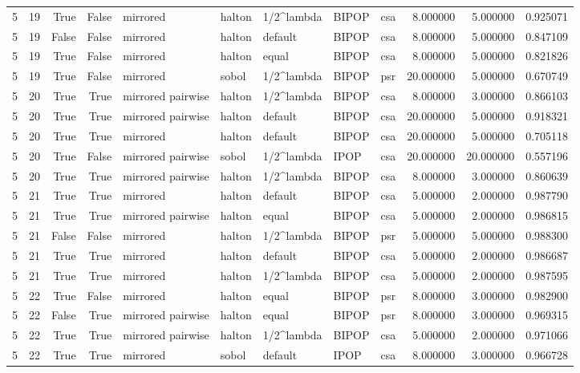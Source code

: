 \begin{tabular}{rrrrlllllrrr}
5 & 19 & True & False & mirrored & halton & 1/2^lambda & BIPOP & csa & 8.000000 & 5.000000 & 0.925071 \\
5 & 19 & False & False & mirrored & halton & default & BIPOP & csa & 8.000000 & 5.000000 & 0.847109 \\
5 & 19 & True & False & mirrored & halton & equal & BIPOP & csa & 8.000000 & 5.000000 & 0.821826 \\
5 & 19 & True & False & mirrored & sobol & 1/2^lambda & BIPOP & psr & 20.000000 & 5.000000 & 0.670749 \\
5 & 20 & True & True & mirrored pairwise & halton & 1/2^lambda & BIPOP & csa & 8.000000 & 3.000000 & 0.866103 \\
5 & 20 & True & True & mirrored pairwise & halton & default & BIPOP & csa & 20.000000 & 5.000000 & 0.918321 \\
5 & 20 & True & True & mirrored & halton & default & BIPOP & csa & 20.000000 & 5.000000 & 0.705118 \\
5 & 20 & True & False & mirrored pairwise & sobol & 1/2^lambda & IPOP & csa & 20.000000 & 20.000000 & 0.557196 \\
5 & 20 & True & True & mirrored pairwise & halton & 1/2^lambda & BIPOP & csa & 8.000000 & 3.000000 & 0.860639 \\
5 & 21 & True & True & mirrored & halton & default & BIPOP & csa & 5.000000 & 2.000000 & 0.987790 \\
5 & 21 & True & True & mirrored pairwise & halton & equal & BIPOP & csa & 5.000000 & 2.000000 & 0.986815 \\
5 & 21 & False & False & mirrored & halton & 1/2^lambda & BIPOP & psr & 5.000000 & 5.000000 & 0.988300 \\
5 & 21 & True & True & mirrored & halton & default & BIPOP & csa & 5.000000 & 2.000000 & 0.986687 \\
5 & 21 & True & True & mirrored & halton & 1/2^lambda & BIPOP & csa & 5.000000 & 2.000000 & 0.987595 \\
5 & 22 & True & False & mirrored & halton & equal & BIPOP & psr & 8.000000 & 3.000000 & 0.982900 \\
5 & 22 & False & True & mirrored pairwise & halton & equal & BIPOP & psr & 8.000000 & 3.000000 & 0.969315 \\
5 & 22 & True & True & mirrored pairwise & halton & 1/2^lambda & BIPOP & csa & 5.000000 & 2.000000 & 0.971066 \\
5 & 22 & True & True & mirrored & sobol & default & IPOP & csa & 8.000000 & 3.000000 & 0.966728 \\

\end{tabular}
